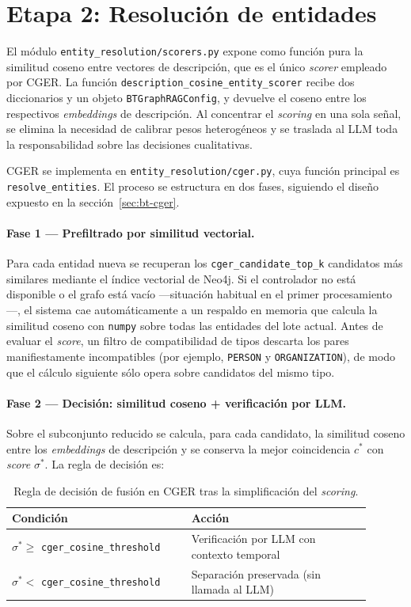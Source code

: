 \section{Etapa 2: Resolución de entidades}\label{sec:impl-cger}

El módulo \texttt{entity\_resolution/scorers.py} expone como función pura la similitud coseno entre vectores de descripción, que es el único \emph{scorer} empleado por CGER. La función \texttt{description\_cosine\_entity\_scorer} recibe dos diccionarios y un objeto \texttt{BTGraphRAGConfig}, y devuelve el coseno entre los respectivos \emph{embeddings} de descripción. Al concentrar el \emph{scoring} en una sola señal, se elimina la necesidad de calibrar pesos heterogéneos y se traslada al LLM toda la responsabilidad sobre las decisiones cualitativas.

CGER se implementa en \texttt{entity\_resolution/cger.py}, cuya función principal es \texttt{resolve\_entities}. El proceso se estructura en dos fases, siguiendo el diseño expuesto en la sección~\ref{sec:bt-cger}.

\paragraph{Fase 1 --- Prefiltrado por similitud vectorial.}
Para cada entidad nueva se recuperan los \texttt{cger\_candidate\_top\_k} candidatos más similares mediante el índice vectorial de Neo4j. Si el controlador no está disponible o el grafo está vacío ---situación habitual en el primer procesamiento---, el sistema cae automáticamente a un respaldo en memoria que calcula la similitud coseno con \texttt{numpy} sobre todas las entidades del lote actual. Antes de evaluar el \emph{score}, un filtro de compatibilidad de tipos descarta los pares manifiestamente incompatibles (por ejemplo, \texttt{PERSON} y \texttt{ORGANIZATION}), de modo que el cálculo siguiente sólo opera sobre candidatos del mismo tipo.

\paragraph{Fase 2 --- Decisión: similitud coseno + verificación por LLM.}
Sobre el subconjunto reducido se calcula, para cada candidato, la similitud coseno entre los \emph{embeddings} de descripción y se conserva la mejor coincidencia $c^\ast$ con \emph{score} $\sigma^\ast$. La regla de decisión es:

\begin{table}[H]
\centering
\small
\begin{tabular}{p{0.45\linewidth}p{0.45\linewidth}}
\hline
\textbf{Condición} & \textbf{Acción} \\ \hline
$\sigma^\ast \geq$ \texttt{cger\_cosine\_threshold} & Verificación por LLM con contexto temporal \\
$\sigma^\ast <$ \texttt{cger\_cosine\_threshold} & Separación preservada (sin llamada al LLM) \\ \hline
\end{tabular}
\caption{Regla de decisión de fusión en CGER tras la simplificación del \emph{scoring}.}
\label{tab:impl-cger-thresholds}
\end{table}

